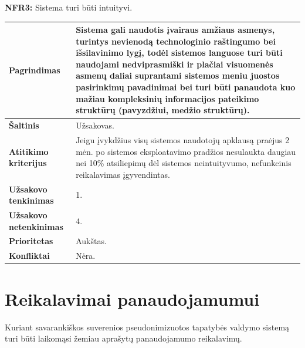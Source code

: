 \documentclass[12pt]{article}
\begin{document}
\noindent \textbf{NFR3:} Sistema turi būti intuityvi.
\label{sec:NFR3}
\begin{table}[htb!]
    \captionsetup{justification=centering}
    \begin{tabular}{|m{4.9cm}|m{11cm}|}
        \hline
        \raggedleft \textbf{\cellcolor{deepchampagne}Pagrindimas} &
        Sistema gali naudotis įvairaus amžiaus asmenys, turintys nevienodą
        technologinio raštingumo bei išsilavinimo lygį, todėl sistemos languose
        turi būti naudojami nedviprasmiški ir plačiai visuomenės asmenų daliai
        suprantami sistemos meniu juostos pasirinkimų pavadinimai bei turi būti
        panaudota kuo mažiau kompleksinių informacijos pateikimo struktūrų
        (pavyzdžiui, medžio struktūrų). \\
        \hline
        \raggedleft \textbf{\cellcolor{deepchampagne}Šaltinis} & Užsakovas. \\
        \hline
        \raggedleft \textbf{\cellcolor{deepchampagne}Atitikimo kriterijus} & 
        Jeigu įvykdžius visų sistemos naudotojų apklausą praėjus 2 mėn. po
        sistemos eksploatavimo pradžios nesulaukta daugiau
        nei 10\% atsiliepimų dėl sistemos neintuityvumo, nefunkcinis
        reikalavimas įgyvendintas. \\
        \hline
        \raggedleft \textbf{\cellcolor{deepchampagne}Užsakovo tenkinimas} & 1. \\
        \hline
        \raggedleft \textbf{\cellcolor{deepchampagne}Užsakovo netenkinimas} & 4. \\
        \hline
        \raggedleft \textbf{\cellcolor{deepchampagne}Prioritetas} & Aukštas. \\
        \hline
        \raggedleft \textbf{\cellcolor{deepchampagne}Konfliktai} & Nėra. \\
        \hline
    \end{tabular}
\end{table}

\newpage

\section{Reikalavimai panaudojamumui}
Kuriant savarankiškos suverenios pseudonimizuotos tapatybės valdymo sistemą
turi būti laikomąsi žemiau aprašytų panaudojamumo reikalavimų.
\vskip 10pt
\end{document}
